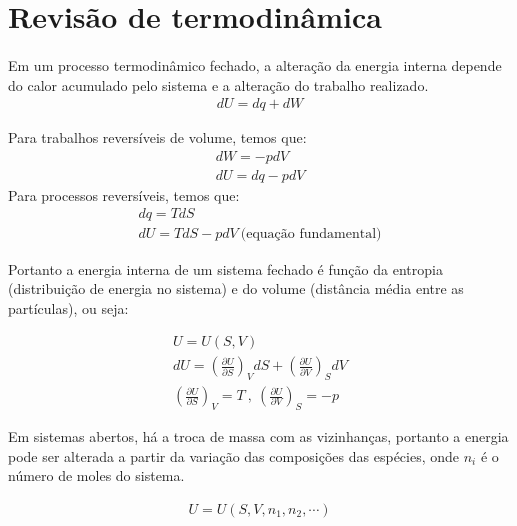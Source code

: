 
  \section*{Revisão de termodinâmica}

  \paragraph{ }

  \begin{definition}
    Em um processo termodinâmico fechado, a alteração da energia interna depende do calor acumulado pelo sistema e a alteração do trabalho realizado.
    \begin{gather}
      dU = dq + dW
    \end{gather}
  \end{definition}

  \begin{corollary}
    Para trabalhos reversíveis de volume, temos que:
    \begin{gather}
      dW = -p dV \\
      dU = dq - p dV
    \end{gather}
    Para processos reversíveis, temos que:
    \begin{gather}
      dq = TdS \\
      dU = TdS - pdV \ \text{(equação fundamental)}
    \end{gather}
  \end{corollary}

  Portanto a energia interna de um sistema fechado é função da entropia (distribuição de energia no sistema) e do volume (distância média entre as partículas), ou seja:
  \begin{theorem}
    \begin{gather}
      U = U(S,V) \\
      dU = \left( \frac{\partial U}{\partial S} \right)_V dS + \left( \frac{\partial U}{\partial V}  \right)_S dV \\
      \left( \frac{\partial U}{\partial S}  \right)_V = T \ , \ \left( \frac{\partial U}{\partial V}  \right)_S = -p
    \end{gather}
  \end{theorem}

  Em sistemas abertos, há a troca de massa com as vizinhanças, portanto a energia pode ser alterada a partir da variação das composições das espécies, onde $n_i$ é o número de moles do sistema.
  \begin{theorem}
    \begin{gather}
      U = U(S,V,n_1,n_2, \cdots)
    \end{gather}
  \end{theorem}

